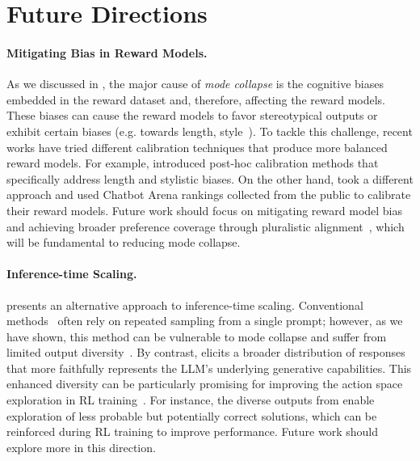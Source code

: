 
\section{Future Directions}\label{sec:future_direction}

\paragraph{Mitigating Bias in Reward Models.} As we discussed in , the major cause of \emph{mode collapse} is the cognitive biases embedded in the reward dataset and, therefore, affecting the reward models. These biases can cause the reward models to favor stereotypical  outputs or exhibit certain biases (e.g. towards length, style~\citep{liu2024rmbenchbenchmarkingrewardmodels}). To tackle this challenge, recent works have tried different calibration techniques that produce more balanced reward models. For example, \citet{huang2024posthocrewardcalibrationcase} introduced post-hoc calibration methods that specifically address length and stylistic biases. On the other hand, \citet{zhu2025charmcalibratingrewardmodels} took a different approach and used Chatbot Arena rankings collected from the public to calibrate their reward models. Future work should focus on mitigating reward model bias and achieving broader preference coverage through pluralistic alignment~\citep{sorensen2024roadmappluralisticalignment}, which will be fundamental to reducing mode collapse.

\paragraph{Inference-time Scaling.}
\ours presents an alternative approach to inference-time scaling. Conventional methods~\citep{snell_scaling_2024,brown_large_2024} often rely on repeated sampling from a single prompt; however, as we have shown, this method can be vulnerable to mode collapse and suffer from limited output diversity~\citep{yang_how_2025}. By contrast, \ours elicits a broader distribution of responses that more faithfully represents the LLM's underlying generative capabilities. This enhanced diversity can be particularly promising for improving the action space exploration in RL training~\citep{cui2025entropymechanismreinforcementlearning,wang20258020rulehighentropyminority}. For instance, the diverse outputs from \ourslower
enable exploration of less probable but potentially correct solutions, which can be reinforced during RL training to improve performance. Future work should explore more in this direction.

